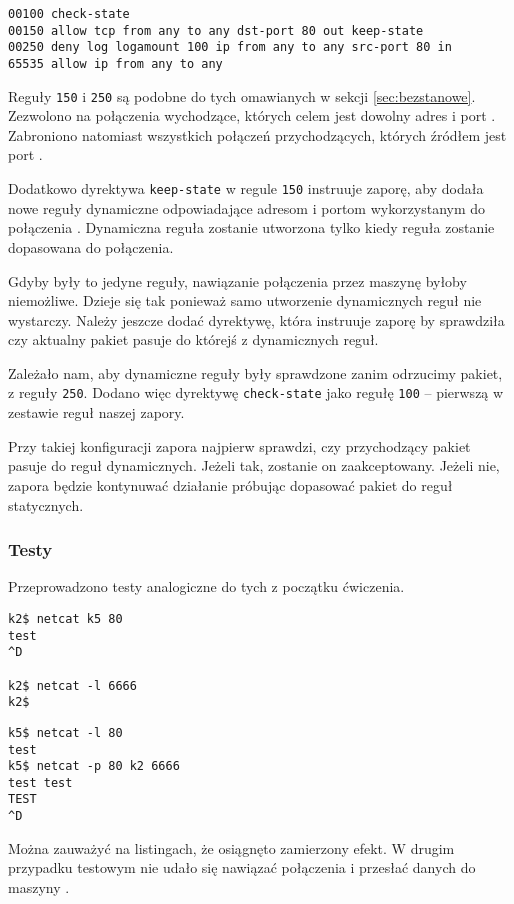 \begin{lstlisting}
00100 check-state
00150 allow tcp from any to any dst-port 80 out keep-state
00250 deny log logamount 100 ip from any to any src-port 80 in
65535 allow ip from any to any
\end{lstlisting}

Reguły \texttt{150} i \texttt{250} są podobne do tych omawianych w sekcji
\ref{sec:bezstanowe}. Zezwolono na połączenia \tcp{} wychodzące, których celem
jest dowolny adres i port \pos. Zabroniono natomiast wszystkich połączeń
przychodzących, których źródłem jest port \pos.

Dodatkowo dyrektywa \texttt{keep-state} w regule \texttt{150} instruuje zaporę,
aby dodała nowe reguły dynamiczne odpowiadające adresom i portom wykorzystanym
do połączenia \cite{bsd:firewall}. Dynamiczna reguła zostanie utworzona tylko
kiedy reguła zostanie dopasowana do połączenia.

Gdyby były to jedyne reguły, nawiązanie połączenia \tcp{} przez maszynę \kdwa{}
byłoby niemożliwe. Dzieje się tak ponieważ samo utworzenie dynamicznych reguł
nie wystarczy. Należy jeszcze dodać dyrektywę, która instruuje zaporę by
sprawdziła czy aktualny pakiet pasuje do którejś z dynamicznych reguł.

Zależało nam, aby dynamiczne reguły były sprawdzone zanim odrzucimy pakiet, z
reguły \texttt{250}. Dodano więc dyrektywę \texttt{check-state} jako regułę
\texttt{100} -- pierwszą w zestawie reguł naszej zapory.

Przy takiej konfiguracji zapora najpierw sprawdzi, czy przychodzący pakiet
pasuje do reguł dynamicznych. Jeżeli tak, zostanie on zaakceptowany. Jeżeli nie,
zapora będzie kontynuwać działanie próbując dopasować pakiet do reguł
statycznych.


\subsubsection{Testy}

Przeprowadzono testy analogiczne do tych z początku ćwiczenia.

\begin{minipage}[b]{0.4\linewidth}
\begin{lstlisting}[caption={\kdwa{}}]
k2$ netcat k5 80
test
^D

k2$ netcat -l 6666
k2$
\end{lstlisting}
\end{minipage}
\begin{minipage}[b]{0.12\linewidth}
  \hfill\vspace{1cm}
\end{minipage}
\begin{minipage}[b]{0.4\linewidth}
\begin{lstlisting}[caption={\kpiec{}}]
k5$ netcat -l 80
test
k5$ netcat -p 80 k2 6666
test test
TEST
^D
\end{lstlisting}
\end{minipage}

Można zauważyć na listingach, że osiągnęto zamierzony efekt. W drugim przypadku
testowym nie udało się nawiązać połączenia i przesłać danych do maszyny \kdwa.
